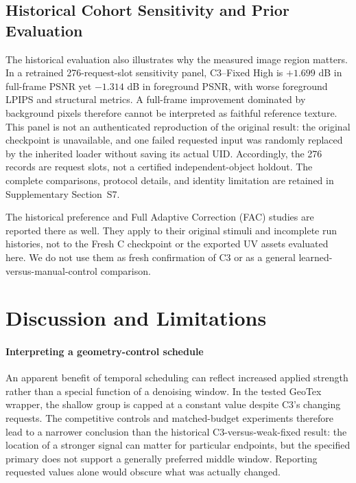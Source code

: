 \documentclass[times,twocolumn,final]{elsarticle}
\begin{document}
\subsection{Historical Cohort Sensitivity and Prior Evaluation}
\label{subsec:original276}

The historical evaluation also illustrates why the measured image region matters. In a retrained 276-request-slot sensitivity panel, C3--Fixed High is $+1.699$ dB in full-frame PSNR yet $-1.314$ dB in foreground PSNR, with worse foreground LPIPS and structural metrics. A full-frame improvement dominated by background pixels therefore cannot be interpreted as faithful reference texture. This panel is not an authenticated reproduction of the original result: the original checkpoint is unavailable, and one failed requested input was randomly replaced by the inherited loader without saving its actual UID. Accordingly, the 276 records are request slots, not a certified independent-object holdout. The complete comparisons, protocol details, and identity limitation are retained in Supplementary Section~S7.

The historical preference and Full Adaptive Correction (FAC) studies are reported there as well. They apply to their original stimuli and incomplete run histories, not to the Fresh C checkpoint or the exported UV assets evaluated here. We do not use them as fresh confirmation of C3 or as a general learned-versus-manual-control comparison.

\FloatBarrier
\section{Discussion and Limitations}
\label{sec:limitations}

\paragraph{Interpreting a geometry-control schedule}
An apparent benefit of temporal scheduling can reflect increased applied strength rather than a special function of a denoising window. In the tested GeoTex wrapper, the shallow group is capped at a constant value despite C3's changing requests. The competitive controls and matched-budget experiments therefore lead to a narrower conclusion than the historical C3-versus-weak-fixed result: the location of a stronger signal can matter for particular endpoints, but the specified primary does not support a generally preferred middle window. Reporting requested values alone would obscure what was actually changed.
\end{document}
